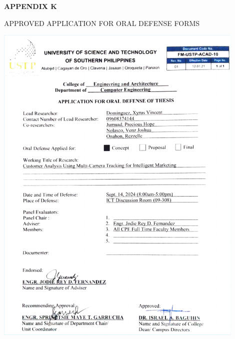 \clearpage

\begin{center}
	{\bf APPENDIX K}
\end{center}

\begin{center}
	APPROVED APPLICATION FOR ORAL DEFENSE FORMS
\end{center}

\begin{center}
	\includegraphics[width=0.9\textwidth]{app/M.pdf}

\end{center}
